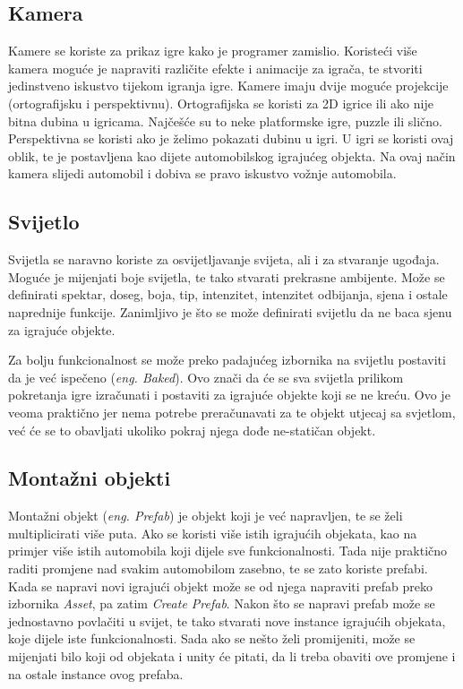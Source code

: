 \subsection{Kamera}
Kamere se koriste za prikaz igre kako je programer zamislio. Koristeći više kamera moguće je napraviti različite efekte i animacije za igrača, te stvoriti jedinstveno iskustvo tijekom igranja igre. Kamere imaju dvije moguće projekcije (ortografijsku i perspektivnu). Ortografijska se koristi za 2D igrice ili ako nije bitna dubina u igricama. Najčešće su to neke platformske igre, puzzle ili slično. Perspektivna se koristi ako je želimo pokazati dubinu u igri. U igri se koristi ovaj oblik, te je postavljena kao dijete automobilskog igrajućeg objekta. Na ovaj način kamera slijedi automobil i dobiva se pravo iskustvo vožnje automobila.
\subsection{Svijetlo}
Svijetla se naravno koriste za osvijetljavanje svijeta, ali i za stvaranje ugođaja. Moguće je mijenjati boje svijetla, te tako stvarati prekrasne ambijente. Može se definirati spektar, doseg, boja, tip, intenzitet, intenzitet odbijanja, sjena i ostale naprednije funkcije. Zanimljivo je što se može definirati svijetlu da ne baca sjenu za igrajuće objekte. \par
Za bolju funkcionalnost se može preko padajućeg izbornika na svijetlu postaviti da je već ispečeno (\emph{eng. Baked}). Ovo znači da će se sva svijetla prilikom pokretanja igre izračunati i postaviti za igrajuće objekte koji se ne kreću. Ovo je veoma praktično jer nema potrebe preračunavati za te objekt utjecaj sa svjetlom, već će se to obavljati ukoliko pokraj njega dođe ne-statičan objekt.
\subsection{Montažni objekti}
Montažni objekt (\emph{eng. Prefab}) je objekt koji je već napravljen, te se želi multiplicirati više puta. Ako se koristi više istih igrajućih objekata, kao na primjer više istih automobila koji dijele sve funkcionalnosti. Tada nije praktično raditi promjene nad svakim automobilom zasebno, te se zato koriste prefabi. Kada se napravi novi igrajući objekt može se od njega napraviti prefab preko izbornika \emph{Asset}, pa zatim \emph{Create Prefab}. Nakon što se napravi prefab može se jednostavno povlačiti u svijet, te tako stvarati nove instance igrajućih objekata, koje dijele iste funkcionalnosti. Sada ako se nešto želi promijeniti, može se mijenjati bilo koji od objekata i unity će pitati, da li treba obaviti ove promjene i na ostale instance ovog prefaba.

